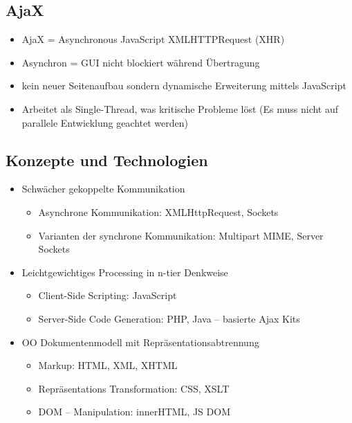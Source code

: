 \documentclass{article} %
\begin{document}
	\subsection{AjaX}
	\begin{itemize}
		\item AjaX = Asynchronous JavaScript XMLHTTPRequest (XHR)
		\item Asynchron = GUI nicht blockiert während Übertragung
		\item kein neuer Seitenaufbau sondern dynamische Erweiterung mittels JavaScript
		\item Arbeitet als Single-Thread, was kritische Probleme löst (Es muss nicht auf parallele Entwicklung geachtet werden)
	\end{itemize}
	\subsection{Konzepte und Technologien}
	\begin{itemize}
		\item Schwächer gekoppelte Kommunikation
		\begin{itemize}
			\item Asynchrone Kommunikation: XMLHttpRequest, Sockets
			\item Varianten der synchrone Kommunikation: Multipart MIME, Server Sockets
		\end{itemize}
		\item Leichtgewichtiges Processing in n-tier Denkweise
		\begin{itemize}
			\item Client-Side Scripting: JavaScript
			\item Server-Side Code Generation: PHP, Java – basierte Ajax Kits
		\end{itemize}
		\item OO Dokumentenmodell mit Repräsentationsabtrennung
		\begin{itemize}
			\item Markup: HTML, XML, XHTML
			\item Repräsentations Transformation: CSS, XSLT
			\item DOM – Manipulation: innerHTML, JS DOM
		\end{itemize}
	\end{itemize}
\end{document}
